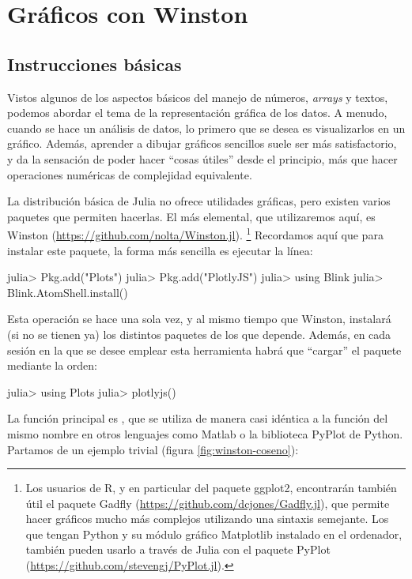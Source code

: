 \chapter{Gráficos con Winston}

\section{Instrucciones básicas}

Vistos algunos de los aspectos básicos del manejo de números, \emph{arrays} y textos, podemos abordar el tema de la representación gráfica de los datos. A menudo, cuando se hace un análisis de datos, lo primero que se desea es visualizarlos en un gráfico. Además, aprender a dibujar gráficos sencillos suele ser más satisfactorio, y da la sensación de poder hacer ``cosas útiles'' desde el principio, más que hacer operaciones numéricas de complejidad equivalente.

La distribución básica de Julia no ofrece utilidades gráficas, pero existen varios paquetes que permiten hacerlas. El más elemental, que utilizaremos aquí, es Winston (\url{https://github.com/nolta/Winston.jl}).%
\footnote{%
Los usuarios de R, y en particular del paquete ggplot2, encontrarán también útil el paquete Gadfly (\url{https://github.com/dcjones/Gadfly.jl}), que permite hacer gráficos mucho más complejos utilizando una sintaxis semejante. Los que tengan Python y su módulo gráfico Matplotlib instalado en el ordenador, también pueden usarlo a través de Julia con el paquete PyPlot (\url{https://github.com/stevengj/PyPlot.jl}).%
}
Recordamos aquí que para instalar este paquete, la forma más sencilla es ejecutar la línea:

\begin{jlconcode}
julia> Pkg.add("Plots")
julia> Pkg.add("PlotlyJS")
julia> using Blink
julia> Blink.AtomShell.install()
\end{jlconcode}

Esta operación se hace una sola vez, y al mismo tiempo que Winston, instalará (si no se tienen ya) los distintos paquetes de los que depende. Además, en cada sesión en la que se desee emplear esta herramienta habrá que ``cargar'' el paquete mediante la orden:

\begin{jlconcode}
julia> using Plots
julia> plotlyjs()
\end{jlconcode}

La función principal es , que se utiliza de manera casi idéntica a la función del mismo nombre en otros lenguajes como Matlab o la biblioteca PyPlot de Python. Partamos de un ejemplo trivial (figura \ref{fig:winston-coseno}):

